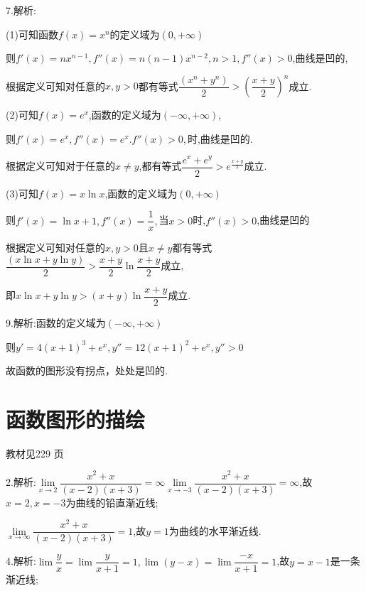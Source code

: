 7.解析:

(1)可知函数$f(x) = {x^n}$的定义域为$(0, + \infty )$

则$f'(x) = n{x^{n - 1}},f''(x) = n(n - 1){x^{n - 2}},n > 1,f''(x) > 0$,曲线是凹的,

根据定义可知对任意的$x,y > 0$都有等式$\dfrac{{({x^n} + {y^n})}}{2} > {\left( {\dfrac{{x + y}}{2}} \right)^n}$成立.

(2)可知$f(x) = {e^x}$,函数的定义域为$\left( { - \infty , + \infty } \right)$,

则$f'(x) = {e^x},f''(x) = {e^x}.f''(x) > 0,$时,曲线是凹的.

根据定义可知对于任意的$x \ne y$,都有等式$\dfrac{{{e^x} + {e^y}}}{2} > {e^{\frac{{x + y}}{2}}}$成立.

(3)可知$f(x) = x\ln x$,函数的定义域为$\left( {0, + \infty } \right)$

则$f'(x) = \ln x + 1,f''(x) = \dfrac{1}{x},$当$x > 0$时,$f''(x) > 0$,曲线是凹的

根据定义可知对任意的$x,y > 0$且$x \ne y$都有等式$\dfrac{{\left( {x\ln x + y\ln y} \right)}}{2} > \dfrac{{x + y}}{2}\ln \dfrac{{x + y}}{2}$成立,

即$x\ln x + y\ln y > \left( {x + y} \right)\ln \dfrac{{x + y}}{2}$成立.

9.解析:函数的定义域为$\left( { - \infty , + \infty } \right)$

则$y' = 4{\left( {x + 1} \right)^3} + {e^x},y'' = 12{\left( {x + 1} \right)^2} + {e^x},y'' > 0$

 故函数的图形没有拐点，处处是凹的.

\section{函数图形的描绘}
\begin{flushright}
  \color{zhanqing!80}
   教材见229 页 %
\end{flushright}
2.解析:$\mathop {\lim }\limits_{x \to 2} \dfrac{{{x^2} + x}}{{\left( {x - 2} \right)\left( {x + 3} \right)}} = \infty \mathop {\lim }\limits_{x \to  - 3} \dfrac{{{x^2} + x}}{{\left( {x - 2} \right)\left( {x + 3} \right)}} = \infty $,故$x = 2,x = -3$为曲线的铅直渐近线;

$\mathop {\lim }\limits_{x \to \infty } \dfrac{{{x^2} + x}}{{\left( {x - 2} \right)\left( {x + 3} \right)}} = 1$,故$y = 1$为曲线的水平渐近线.

4.解析:$\lim \dfrac{y}{x} = \lim \dfrac{y}{{x + 1}} = 1,\lim \left( {y - x} \right) = \lim \dfrac{{ - x}}{{x + 1}} = 1$,故$y = x - 1$是一条渐近线;

